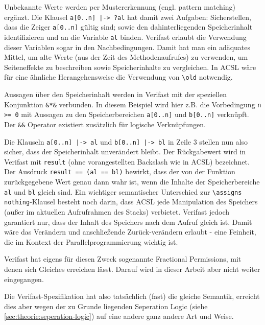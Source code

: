 Unbekannte Werte werden per Mustererkennung (engl. pattern matching) ergänzt. Die Klausel
\lstinline{a[0..n] |-> ?al} hat damit zwei Aufgaben: Sicherstellen, dass die Zeiger \lstinline{a[0..n]}
gültig sind; sowie den dahinterliegenden Speicherinhalt identifizieren und an die Variable \lstinline{al}
binden. Verifast erlaubt die Verwendung dieser Variablen sogar in den Nachbedingungen. Damit hat man ein 
adäquates Mittel, um alte Werte (aus der Zeit des Methodenaufrufes) zu verwenden, um Seiteneffekte zu
beschreiben sowie Speicherinhalte zu vergleichen. In ACSL wäre für eine ähnliche Herangehensweise
die Verwendung von \lstinline{\old} notwendig.

Aussagen über den Speicherinhalt werden in Verifast mit der speziellen Konjunktion \lstinline{&*&} 
verbunden. In diesem Beispiel wird hier z.B. die Vorbedingung \lstinline{n >= 0} mit Aussagen zu den 
Speicherbereichen \lstinline{a[0..n]} und \lstinline{b[0..n]} verknüpft. Der \lstinline{&&} Operator 
existiert zusätzlich für logische Verknüpfungen.

Die Klauseln \lstinline{a[0..n] |-> al} und \lstinline{b[0..n] |-> bl} in Zeile 3 stellen nun also sicher, 
dass der Speicherinhalt unverändert bleibt. Der Rückgabewert wird in Verifast mit \lstinline{result} 
(ohne vorangestellten Backslash wie in ACSL) bezeichnet. Der Ausdruck \lstinline{result == (al == bl)} 
bewirkt, dass der von der Funktion zurückgegebene Wert genau dann wahr ist, wenn die Inhalte der 
Speicherbereiche \lstinline{al} und \lstinline{bl} gleich sind.
\newline
\newline
{}
Ein wichtiger semantischer Unterschied zur \lstinline{\assigns nothing}-Klausel besteht noch darin, 
dass ACSL jede Manipulation des Speichers (außer im aktuellen Aufrufrahmen des Stacks) verbietet. 
Verifast jedoch garantiert nur, dass der Inhalt des Speichers nach dem Aufruf gleich ist. Damit wäre 
das Verändern und anschließende Zurück-verändern erlaubt - eine Feinheit, die im Kontext der
Parallelprogrammierung wichtig ist.

Verifast hat eigens für diesen Zweck sogenannte Fractional Permissions, mit denen sich Gleiches
erreichen lässt. Darauf wird in dieser Arbeit aber nicht weiter eingegangen.

Die Verifast-Spezifikation hat also tatsächlich (fast) die gleiche Semantik, erreicht dies aber wegen der 
zu Grunde liegenden Seperation Logic (siehe \ref{sec:theorie:seperation-logic}) auf eine andere ganz 
andere Art und Weise.

